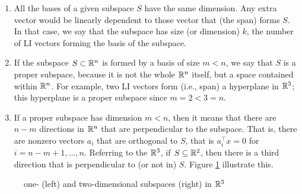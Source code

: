 \begin{enumerate}
	\item All the bases of a given subspace $S$ have the same dimension. Any extra vector would be linearly dependent to those vector that (the span) forms $S$. In that case, we say that the subspace has size (or dimension) $k$, the number of LI vectors forming the basis of the subspace.
	\item If the subspace $S \subset \mathbb{R}^n$ is formed by a basis of size $m < n$, we say that $S$ is a proper subspace, because it is not the whole $\mathbb{R}^n$ itself, but a space contained within $\mathbb{R}^n$. For example, two LI vectors form (i.e., span) a hyperplane in $\mathbb{R}^3$; this hyperplane is a proper subspace since $m=2 <3=n$.
	\item If a proper subspace has dimension $m < n$, then it means that there are $n-m$ directions in $\mathbb{R}^n$ that are perpendicular to the subspace. That is, there are nonzero vectors $a_i$ that are orthogonal to $S$, that is $a_i^\top x = 0$ for $i = n-m + 1, ..., n$. Referring to the $\mathbb{R}^3$, if $S \subseteq \mathbb{R}^2$, then there is a third direction that is perpendicular to (or not in) $S$. Figure \ref{p1c2:fig:proper_subpaces} illustrate this.
\end{enumerate}

\begin{figure}
	\centering
	\vspace{-12pt}
	\caption{one- (left) and two-dimensional subspaces (right) in $\mathbb{R}^3$} \label{p1c2:fig:proper_subpaces}
\end{figure}

